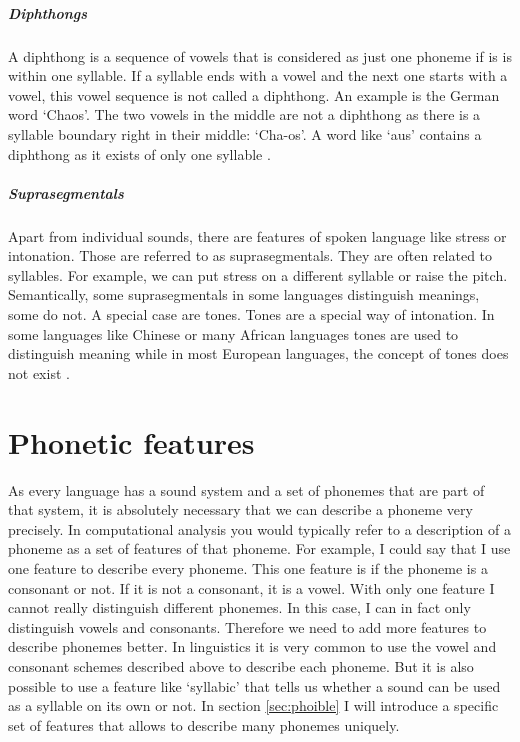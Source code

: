 \subparagraph{Diphthongs}
A diphthong is a sequence of vowels that is considered as just one phoneme if is is within one syllable. If a syllable ends with a vowel and the next one starts with a vowel, this vowel sequence is not called a diphthong. An example is the German word `Chaos'. The two vowels in the middle are not a diphthong as there is a syllable boundary right in their middle: `Cha-os'. A word like `aus' contains a diphthong as it exists of only one syllable \citep{Intro.2007}. 

\subparagraph{Suprasegmentals} Apart from individual sounds, there are features of spoken language like stress or intonation. Those are referred to as suprasegmentals. They are often related to syllables. For example, we can put stress on a different syllable or raise the pitch. Semantically, some suprasegmentals in some languages distinguish meanings, some do not. A special case are tones. Tones are a special way of intonation. In some languages like Chinese or many African languages tones are used to distinguish meaning while in most European languages, the concept of tones does not exist \citep{Intro.2007}.

\section{Phonetic features}
As every language has a sound system and a set of phonemes that are part of that system, it is absolutely necessary that we can describe a phoneme very precisely. In computational analysis you would typically refer to a description of a phoneme as a set of features of that phoneme. For example, I could say that I use one feature to describe every phoneme. This one feature is if the phoneme is a consonant or not. If it is not a consonant, it is a vowel. With only one feature I cannot really distinguish different phonemes. In this case, I can in fact only distinguish vowels and consonants. Therefore we need to add more features to describe phonemes better. In linguistics it is very common to use the vowel and consonant schemes described above to describe each phoneme. But it is also possible to use a feature like `syllabic' that tells us whether a sound can be used as a syllable on its own or not. In section \ref{sec:phoible}  I will introduce a specific set of features that allows to describe many phonemes uniquely. 

